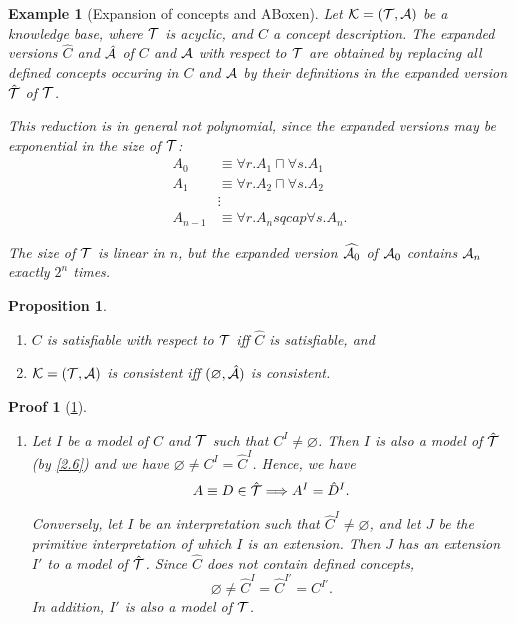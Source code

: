 \documentclass[openany]{scrbook}
\theoremstyle{break}
\newtheorem{Proposition}[Theorem]{Proposition}
\theoremstyle{nonumberbreak}
\newtheorem{Example}{Example}
\theoremstyle{nonumberplain}
\theoremstyle{nonumberbreak}
\newtheorem{Proof}{Proof}
\newcommand{\then}{\Longrightarrow}
\begin{document}
\begin{Example}[Expansion of concepts and ABoxen]
  \label{exp-blowup}
  Let ${\cal K} = ({\cal T}, {\cal A})$ be a knowledge base, where
  ${\cal T}$ is acyclic, and $C$ a concept description. The expanded
  versions $\hat{C}$ and $\hat{\cal A}$ of $C$ and ${\cal A}$ with
  respect to ${\cal T}$ are obtained by replacing all defined concepts
  occuring in $C$ and ${\cal A}$ by their definitions in the expanded
  version $\hat{\cal T}$ of ${\cal T}$.

  This reduction is in general not polynomial, since the expanded
  versions may be exponential in the size of ${\cal T}$:
  \begin{align*}
    A_0 & \equiv \forall r. A_1 \sqcap \forall s. A_1 \\
    A_1 & \equiv \forall r. A_2 \sqcap \forall s. A_2 \\
    & \vdots \\
    A_{n - 1} & \equiv \forall r. A_n sqcap \forall s. A_n.
  \end{align*}

  The size of ${\cal T}$ is linear in $n$, but the expanded version
  $\widehat{{\cal A}_0}$ of ${\cal A}_0$ contains ${\cal A}_n$ exactly
  $2^n$ times.
\end{Example}

\begin{Proposition}
  \label{2.18}
  \begin{enumerate}
  \item $C$ is satisfiable with respect to ${\cal T}$ iff $\hat{C}$ is
    satisfiable, and
  \item ${\cal K} = ({\cal T}, {\cal A})$ is consistent iff
    $(\varnothing, \hat{{\cal A}})$ is consistent.
  \end{enumerate}
\end{Proposition}

\begin{Proof}[\cref{2.18}]
  \begin{enumerate}
  \item Let $I$ be a model of $C$ and ${\cal T}$ such that $C^I \ne
    \varnothing$. Then $I$ is also a model of $\hat{\cal T}$ (by
    \cref{2.6}) and we have $\varnothing \ne C^I = \hat{C}^I$. Hence,
    we have
    \begin{equation*}
      A \equiv D \in \hat{\cal T} \then A^I = \hat{D}^I.
    \end{equation*}

    Conversely, let $I$ be an interpretation such that $\hat{C}^I \ne
    \varnothing$, and let $J$ be the primitive interpretation of which
    $I$ is an extension. Then $J$ has an extension $I'$ to a model of
    $\hat{\cal T}$. Since $\hat{C}$ does not contain defined concepts,
    \begin{equation*}
      \varnothing \ne \hat{C}^I = \hat{C}^{I'} = C^{I'}.
    \end{equation*}
    In addition, $I'$ is also a model of ${\cal T}$.
  \end{enumerate}
\end{Proof}
\end{document}
